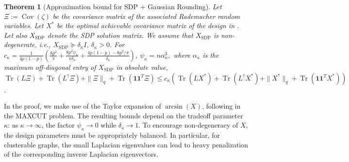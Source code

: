 \documentclass[12pt]{article}
\newtheorem{theorem}{Theorem}
\theoremstyle{definition}
\numberwithin{equation}{section}
\numberwithin{figure}{section}
\newcommand{\cov}{\operatorname{Cov}}
\numberwithin{equation}{section}
\numberwithin{figure}{section}
\begin{document}
\begin{theorem}[Approximation bound for SDP + Gaussian Rounding] \label{corr:approximation_bound}
Let $\Xi := \cov(\zeta)$ be the covariance matrix of the associated Rademacher random variables. Let $X^*$ be the optimal achievable covariance matrix of the design in . 
Let also $X_{\text{SDP}}$ denote the SDP solution matrix. We assume that $X_{\text{SDP}}$ is non-degenerate, i.e., $X_{\text{SDP}} \succeq \delta_\kappa I$, $\delta_\kappa > 0$. For $c_\kappa =\frac{1}{4p(1-p)} \left( \frac{8p^2}{\pi}  + \frac{8p^2 \psi_\kappa}{\pi \delta_\kappa} + \frac{4p(1-p) - 8p^2/\pi}{\delta_\kappa}  \right)$, $\psi_\kappa= n \alpha_\kappa^{3},$ where $\alpha_\kappa$ is the maximum off-diagonal entry of $X_{\text{SDP}}$ in absolute value, $\operatorname{Tr}(L\Xi) + \operatorname{Tr}(L^\dagger\Xi ) +  \|\Xi \|_{q} + \operatorname{Tr}(\mathbf{1} \mathbf{1}^T \Xi) \leq c_\kappa \left( \operatorname{Tr}(LX^*) +  \operatorname{Tr}(L^\dagger X^*)+  \| X^*\|_{q}  + \operatorname{Tr}(\mathbf{1} \mathbf{1}^T X^*)\right)$.
\end{theorem}
In the proof, we make use of the Taylor expansion of $\arcsin{(X)}$, following \citet{nesterov1997quality} in the MAXCUT problem. The resulting bounds depend on the tradeoff parameter $\kappa$: as $\kappa \to \infty$, the factor $\psi_\kappa \to 0$ while $\delta_\kappa \to 1$. To encourage non-degeneracy of $X$, the design parameters must be appropriately balanced. In particular, for clusterable graphs, the small Laplacian eigenvalues can lead to heavy penalization of the corresponding inverse Laplacian eigenvectors. 
\end{document}
